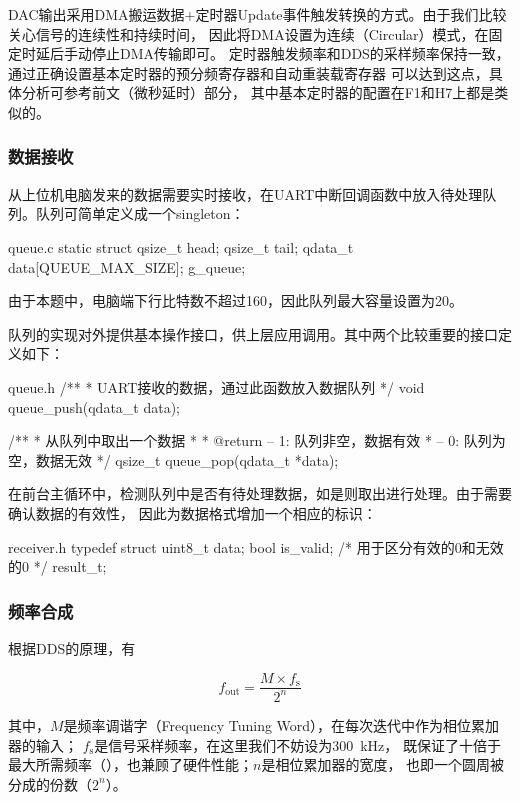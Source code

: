 DAC输出采用DMA搬运数据+定时器Update事件触发转换的方式。由于我们比较关心信号的连续性和持续时间，
因此将DMA设置为连续（Circular）模式，在固定时延后手动停止DMA传输即可。
定时器触发频率和DDS的采样频率保持一致，通过正确设置基本定时器的预分频寄存器和自动重装载寄存器
可以达到这点，具体分析可参考前文（微秒延时）部分，
其中基本定时器的配置在F1和H7上都是类似的。

\subsubsection{数据接收}
从上位机电脑发来的数据需要实时接收，在UART中断回调函数中放入待处理队列。队列可简单定义成一个singleton：

\begin{cbox}{queue.c}
static struct
{
  qsize_t head;
  qsize_t tail;
  qdata_t data[QUEUE_MAX_SIZE];
} g_queue;
\end{cbox}

由于本题中，电脑端下行比特数不超过160，因此队列最大容量设置为20。

队列的实现对外提供基本操作接口，供上层应用调用。其中两个比较重要的接口定义如下：

\begin{cbox}{queue.h}
/**
 * UART接收的数据，通过此函数放入数据队列
 */
void queue_push(qdata_t data);

/**
 * 从队列中取出一个数据
 *
 * @return  -- 1: 队列非空，数据有效
 *          -- 0: 队列为空，数据无效
 */
qsize_t queue_pop(qdata_t *data);
\end{cbox}

在前台主循环中，检测队列中是否有待处理数据，如是则取出进行处理。由于需要确认数据的有效性，
因此为数据格式增加一个相应的标识：

\begin{cbox}{receiver.h}
typedef struct
{
  uint8_t data;
  bool is_valid;  /* 用于区分有效的0和无效的0 */
} result_t;
\end{cbox}

\subsubsection{频率合成}
根据DDS的原理，有

\begin{equation}
  f_\textrm{out} = \frac{M\times f_\textrm{s}}{2^n}
\end{equation}

其中，$M$是频率调谐字（Frequency Tuning Word），在每次迭代中作为相位累加器的输入；
$f_\textrm{s}$是信号采样频率，在这里我们不妨设为\SI{300}{kHz}，
既保证了十倍于最大所需频率（），也兼顾了硬件性能；$n$是相位累加器的宽度，
也即一个圆周被分成的份数（$2^n$）。

